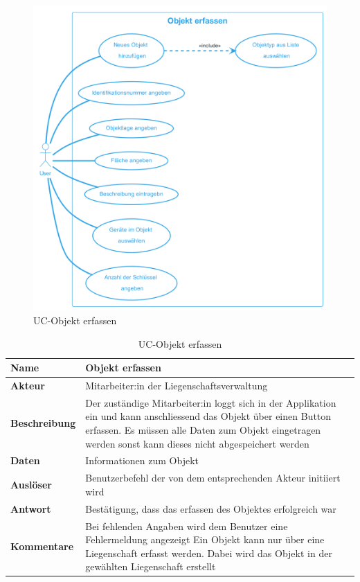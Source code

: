 \begin{figure}[H]
  \begin{center}
    \includegraphics[width=0.8\linewidth]{content/diagrams/out/usecase/objektErfassen/ObjektErfassen.png}
    \caption{UC-Objekt erfassen}
    \label{objekt}
  \end{center}
\end{figure}

\vspace*{-1cm}

\begin{table}[H]
  \centering
  \settowidth{}
  \setlength\extrarowheight{2pt}
  \begin{tabulary}{1.0\textwidth}{|a|m{14cm}|}
    \hline
    \textbf{Name}& Objekt erfassen\\
    \hline
    \textbf{Akteur}& Mitarbeiter:in der Liegenschaftsverwaltung\\
    \hline 
    \textbf{Beschreibung} & Der zuständige Mitarbeiter:in loggt sich in der Applikation ein und kann anschliessend das Objekt über einen Button erfassen. Es müssen alle Daten zum Objekt eingetragen werden sonst kann dieses nicht abgespeichert werden\\
    \hline
    \textbf{Daten} & Informationen zum Objekt\\
    \hline
    \textbf{Auslöser} & Benutzerbefehl der von dem entsprechenden Akteur initiiert wird\\
    \hline
    \textbf{Antwort} & Bestätigung, dass das erfassen des Objektes erfolgreich war\\
    \hline
    \textbf{Kommentare} & Bei fehlenden Angaben wird dem Benutzer eine Fehlermeldung angezeigt\newline 
    Ein Objekt kann nur über eine Liegenschaft erfasst werden. Dabei wird das Objekt in der gewählten Liegenschaft erstellt\\
    \hline
  \end{tabulary}
  \caption{UC-Objekt erfassen}
\end{table}

